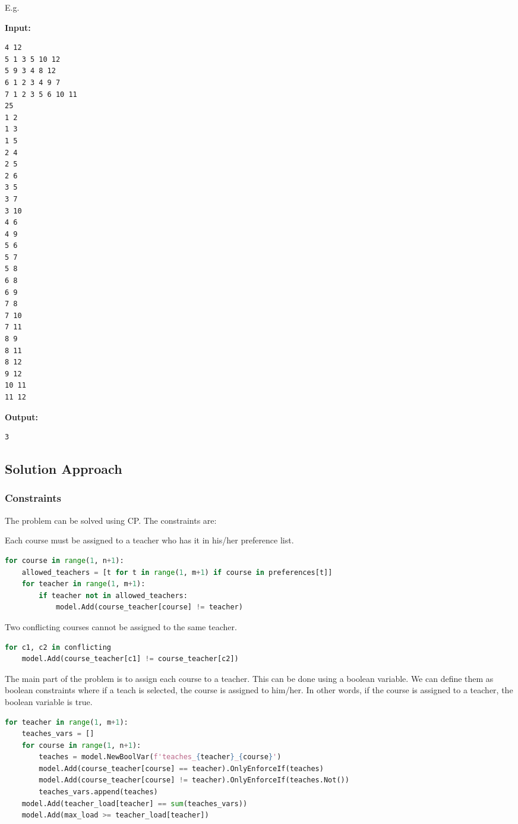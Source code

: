 \documentclass{article}
\begin{document}
E.g.
\begin{multicols}{2}
\textbf{Input:}
\begin{verbatim}
4 12
5 1 3 5 10 12
5 9 3 4 8 12
6 1 2 3 4 9 7
7 1 2 3 5 6 10 11
25
1 2
1 3
1 5
2 4
2 5
2 6
3 5
3 7
3 10
4 6
4 9
5 6
5 7
5 8
6 8
6 9
7 8
7 10
7 11
8 9
8 11
8 12
9 12
10 11
11 12
\end{verbatim}
\columnbreak
\textbf{Output:}
\begin{verbatim}
3
\end{verbatim}
\end{multicols}

\subsection{Solution Approach}
\subsubsection{Constraints}
The problem can be solved using CP. The constraints are:

Each course must be assigned to a teacher who has it in his/her preference list.
\pagebreak
\begin{lstlisting}[language=Python]
for course in range(1, n+1):
    allowed_teachers = [t for t in range(1, m+1) if course in preferences[t]]
    for teacher in range(1, m+1):
        if teacher not in allowed_teachers:
            model.Add(course_teacher[course] != teacher)
\end{lstlisting}
Two conflicting courses cannot be assigned to the same teacher.
\begin{lstlisting}[language=Python]
for c1, c2 in conflicting
    model.Add(course_teacher[c1] != course_teacher[c2])
\end{lstlisting}
The main part of the problem is to assign each course to a teacher. 
This can be done using a boolean variable. 
We can define them as boolean constraints where if a teach is selected, the course is assigned to him/her. 
In other words, if the course is assigned to a teacher, the boolean variable is true.

\begin{lstlisting}[language=Python]
for teacher in range(1, m+1):
    teaches_vars = []
    for course in range(1, n+1):
        teaches = model.NewBoolVar(f'teaches_{teacher}_{course}')
        model.Add(course_teacher[course] == teacher).OnlyEnforceIf(teaches)
        model.Add(course_teacher[course] != teacher).OnlyEnforceIf(teaches.Not())
        teaches_vars.append(teaches)
    model.Add(teacher_load[teacher] == sum(teaches_vars))
    model.Add(max_load >= teacher_load[teacher])
\end{lstlisting}
\end{document}
